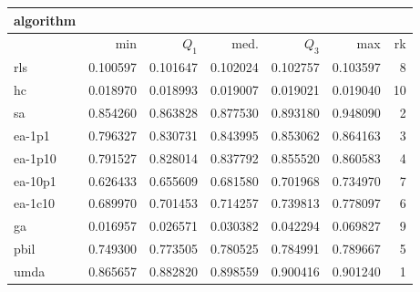 \begin{tabular}{@{}l*{5}{>{{}}N{1}{3}}>{{}}N{2}{0}@{}}
\toprule
{algorithm} &  \\
\midrule
& {min} & {$Q_1$} & {med.} & {$Q_3$} & {max} & {rk}\\
\midrule
rls & 0.100597 & 0.101647 & 0.102024 & 0.102757 & 0.103597 & 8\\
hc & 0.018970 & 0.018993 & 0.019007 & 0.019021 & 0.019040 & 10\\
sa & 0.854260 & 0.863828 & 0.877530 & 0.893180 & {\color{blue}} 0.948090 & 2\\
ea-1p1 & 0.796327 & 0.830731 & 0.843995 & 0.853062 & 0.864163 & 3\\
ea-1p10 & 0.791527 & 0.828014 & 0.837792 & 0.855520 & 0.860583 & 4\\
ea-10p1 & 0.626433 & 0.655609 & 0.681580 & 0.701968 & 0.734970 & 7\\
ea-1c10 & 0.689970 & 0.701453 & 0.714257 & 0.739813 & 0.778097 & 6\\
ga & 0.016957 & 0.026571 & 0.030382 & 0.042294 & 0.069827 & 9\\
pbil & 0.749300 & 0.773505 & 0.780525 & 0.784991 & 0.789667 & 5\\
umda & {\color{blue}} 0.865657 & {\color{blue}} 0.882820 & {\color{blue}} 0.898559 & {\color{blue}} 0.900416 & 0.901240 & 1\\
\bottomrule
\end{tabular}
